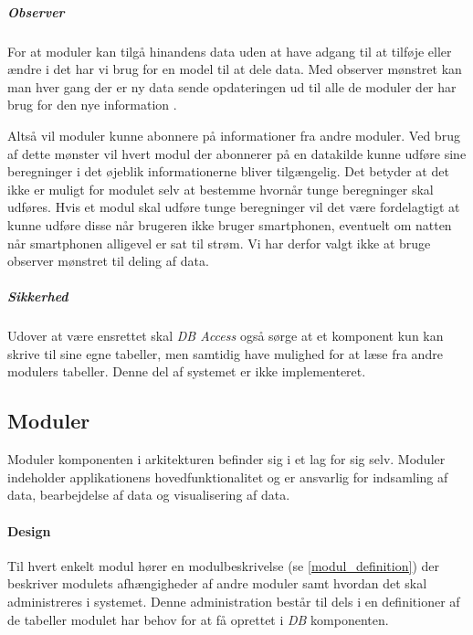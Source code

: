 \subparagraph{Observer}
For at moduler kan tilgå hinandens data uden at have adgang til at tilføje eller ændre i det har vi brug for en model til at dele data.
Med observer mønstret kan man hver gang der er ny data sende opdateringen ud til alle de moduler der har brug for den nye information \citep[p.~244]{gamma1994design}.

Altså vil moduler kunne abonnere på informationer fra andre moduler.
Ved brug af dette mønster vil hvert modul der abonnerer på en datakilde kunne udføre sine beregninger i det øjeblik informationerne bliver tilgængelig.
Det betyder at det ikke er muligt for modulet selv at bestemme hvornår tunge beregninger skal udføres.
Hvis et modul skal udføre tunge beregninger vil det være fordelagtigt at kunne udføre disse når brugeren ikke bruger smartphonen, eventuelt om natten når smartphonen alligevel er sat til strøm.
Vi har derfor valgt ikke at bruge observer mønstret til deling af data.

\subparagraph{Sikkerhed}
Udover at være ensrettet skal \textit{DB Access} også sørge at et komponent kun kan skrive til sine egne tabeller, men samtidig have mulighed for at læse fra andre modulers tabeller.
Denne del af systemet er ikke implementeret.

\subsection{Moduler}
Moduler komponenten i arkitekturen befinder sig i et lag for sig selv.
Moduler indeholder applikationens hovedfunktionalitet og er ansvarlig for indsamling af data, bearbejdelse af data og visualisering af data.

\paragraph{Design}
Til hvert enkelt modul hører en modulbeskrivelse (se \cref{modul_definition}) der beskriver modulets afhængigheder af andre moduler samt hvordan det skal administreres i systemet.
Denne administration består til dels i en definitioner af de tabeller modulet har behov for at få oprettet i \textit{DB} komponenten.

